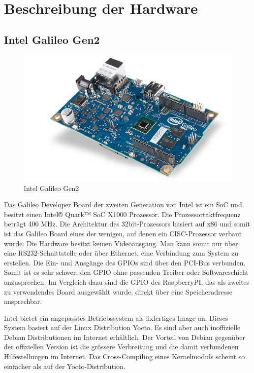 \section{Beschreibung der Hardware}
\label{beschreibung_hardware}
\subsection{Intel Galileo Gen2}

\begin{figure}
\centering
\includegraphics[scale=0.5]{images/iot_galileo.png}
\caption{Intel Galileo Gen2\cite{intel_galileo_image}}
\label{fig:Intel Galileo Gen2}
\end{figure}

Das Galileo Developer Board\cite{intel_datasheet_galileo} der zweiten Generation von
Intel ist ein SoC und besitzt einen Intel® Quark™ SoC X1000 Prozessor. Die Prozessortaktfrequenz beträgt 400 MHz. Die Architektur des 32bit-Prozessors basiert auf x86\cite{intel_datasheet} und somit ist das Galileo
Board eines der wenigen, auf denen ein CISC-Prozessor verbaut wurde. Die Hardware
besitzt keinen Videoausgang. Man kann somit nur über eine RS232-Schnittstelle oder über Ethernet,
eine Verbindung zum System zu erstellen. Die Ein- und Ausgänge des GPIOs sind über den
PCI-Bus verbunden. Somit ist es sehr schwer, den GPIO ohne passenden Treiber oder
Softwareschicht anzusprechen. Im Vergleich dazu sind die GPIO des RaspberryPI, das als zweites zu verwendendes Board ausgewählt wurde, direkt über eine Speicheradresse ansprechbar.
\par
Intel bietet ein angepasstes Betriebssystem als fixfertiges Image an. Dieses System basiert auf
der Linux Distribution Yocto. Es sind aber auch inoffizielle Debian Distributionen im
Internet erhältlich. Der Vorteil von Debian gegenüber der offiziellen Version ist die
grössere Verbreitung und die damit verbundenen Hilfestellungen im Internet. Das Cross-Compiling eines Kernelmoduls scheint so einfacher als auf der Yocto-Distribution.


